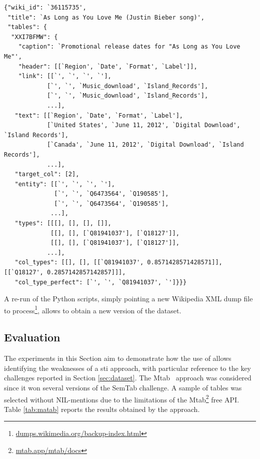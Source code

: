 \begin{lstlisting}[caption=JSON document with the information relating to a Wikipedia page that contains at least one table., label=lst:structure]
{"wiki_id": `36115735',
 "title": `As Long as You Love Me (Justin Bieber song)',
 "tables": {
  "XXI7BFMW": {
    "caption": `Promotional release dates for "As Long as You Love Me"',
    "header": [[`Region', `Date', `Format', `Label']],
    "link": [[`', `', `', `'],
            [`', `', `Music_download', `Island_Records'],
            [`', `', `Music_download', `Island_Records'],
            ...],
   "text": [[`Region', `Date', `Format', `Label'],
            [`United States', `June 11, 2012', `Digital Download', `Island Records'],
            [`Canada', `June 11, 2012', `Digital Download', `Island Records'],
            ...],
   "target_col": [2],
   "entity": [[`', `', `', `'],
              [`', `', `Q6473564', `Q190585'],
              [`', `', `Q6473564', `Q190585'],
             ...],
   "types": [[[], [], [], []],
             [[], [], [`Q81941037'], [`Q18127']],
             [[], [], [`Q81941037'], [`Q18127']],
            ...],
   "col_types": [[], [], [[`Q81941037', 0.8571428571428571]], [[`Q18127', 0.2857142857142857]]],
   "col_type_perfect": [`', `', `Q81941037', `']}}}
\end{lstlisting}

A re-run of the Python scripts, simply pointing a new Wikipedia XML dump file to process\footnote{\href{https://dumps.wikimedia.org/backup-index.html}{dumps.wikimedia.org/backup-index.html}}, allows to obtain a new version of the dataset.

\subsection{Evaluation}
\label{sec:evaluation}

The experiments in this Section aim to demonstrate how the use of \mammotab allows identifying the weaknesses of a \ac{sti} approach, with particular reference to the key challenges reported in Section \ref{sec:dataset}. The Mtab~\cite{Nguyen2021} approach was considered since it won several versions of the SemTab challenge. A sample of  tables was selected without NIL-mentions due to the limitations of the Mtab\footnote{\href{https://mtab.app/mtab/docs}{mtab.app/mtab/docs}} free API. Table \ref{tab:matab} reports the results obtained by the approach. 

